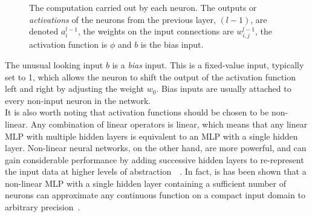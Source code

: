 \documentclass[a4paper, 12pt]{report}
\newcommand{\tit}[1]{\textit{#1}}
\begin{document}
\begin{figure}[h]
\captionsetup{justification=centering}
\begin{center}
\caption{The computation carried out by each neuron. The outputs or \tit{activations} of the neurons from the previous layer, $(l - 1)$, are denoted $a_i^{l-1}$, the weights on the input connections are $w_{i,j}^{l-1}$, the activation function is $\phi$ and $b$ is the bias input.}
\label{fig:neuron}
\end{center}
\end{figure}

The unusual looking input $b$ is a \tit{bias} input. This is a fixed-value input, typically set to 1, which allows the neuron to shift the output of the activation function left and right by adjusting the weight $w_0$. Bias inputs are usually attached to every non-input neuron in the network. \\

It is also worth noting that activation functions should be chosen to be non-linear. Any combination of linear operators is linear, which means that any linear MLP with multiple hidden layers is equivalent to an MLP with a single hidden layer. Non-linear neural networks, on the other hand, are more powerful, and can gain considerable performance by adding successive hidden layers to re-represent the input data at higher levels of abstraction~\cite{dbn:hinton2006}~\cite{scaling:bengio2007}. In fact, is has been shown that a non-linear MLP with a single hidden layer containing a sufficient number of neurons can approximate any continuous function on a compact input domain to arbitrary precision~\cite{universal_approximators:hornik1989}. \\
\end{document}

